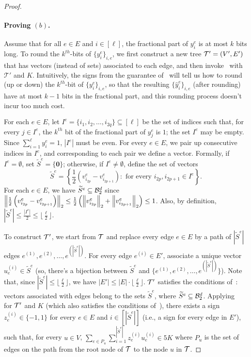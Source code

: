 \begin{proof}
\paragraph{Proving $(b)$.} Assume that for all $e \in E$ and $i\in [\ell]$, the fractional part of $y^e_i$ is at most $k$ bits long. To round the $k^{th}$-bits of $\{y^e_i\}_{i,e}$, we first construct a new tree $\mathcal{T}' = (V',E')$ that has vectors (instead of sets) associated to each edge, and then invoke~ with $\mathcal{T}'$ and $K$. Intuitively, the signs from the guarantee of~ will tell us how to round (up or down) the $k^{th}$-bit of $\{y^e_i\}_{i,e}$, so that the resulting $\{\hat{y}^e_i\}_{i,e}$ (after rounding) have at most $k-1$ bits in the fractional part, and this rounding process doesn't incur too much cost. 

For each $e \in E$, let $I^e = \{i_1, i_2, \ldots, i_{2q}\} \subseteq [\ell]$ be the set of indices such that, for every $j \in I^e$, the $k^{th}$ bit of the fractional part of $y^e_{j}$ is $1$; the set $I^e$ may be empty. Since $\sum_{i=1}^{\ell} y^e_i = 1$, $|I^e|$ must be even. For every $e \in E$, we pair up consecutive indices in $I^e$, and corresponding to each pair we define a vector. Formally, if $I^e = \emptyset$, set $\widetilde{S}^e = \{\mathbf{0}\}$; otherwise, if $I^e \neq \emptyset$, define the set of vectors 
\[
\widetilde{S}^e = \left\{ \frac{1}{2}\left(v^e_{i_{2p}} - v^e_{i_{2p+1}}\right) : \text{ for every } i_{2p}, i_{2p+1} \in I^e \right\}.
\]
For each $e \in E$, we have $\widetilde{S}^e \subseteq \mathcal{B}^d_2$ since $\left\lVert\frac{1}{2}\left(v^e_{i_{2p}} - v^e_{i_{2p+1}}\right)\right\rVert_2 \leq \frac{1}{2}\left( \left\lVert v^e_{i_{2p}}\right\rVert_2 + \left\lVert v^e_{i_{2p+1}}\right\rVert_2\right) \leq 1$.  Also, by definition, $|\widetilde{S}^e| \leq \frac{|I^e|}{2} \leq \lfloor \frac{\ell}{2} \rfloor$. 


To construct $\mathcal{T}'$, we start from $\mathcal{T}$ and replace every edge $e \in E$ by a path of $|\widetilde{S}^e|$ edges $e^{(1)}, e^{(2)}, \ldots, e^{(|\widetilde{S}^e|)}$. For every edge $e^{(i)} \in E'$, associate a unique vector $u^{(i)}_e \in \widetilde{S}^e$ (so, there's a bijection between $\widetilde{S}^e$ and $\{e^{(1)}, e^{(2)}, \ldots, e^{(|\widetilde{S}^e|)}\}$). Note that, since  $|\widetilde{S}^e| \leq \lfloor \frac{\ell}{2} \rfloor$, we have $|E'| \leq |E| \cdot \lfloor \frac{\ell}{2}\rfloor$. $\mathcal{T}'$ satisfies the conditions of~: vectors associated with edges belong to the sets $\widetilde{S}^e$, where $\widetilde{S}^e \subseteq \mathcal{B}^d_2$. Applying~ for $\mathcal{T}'$ and $K$ (which also satisfies the conditions of~), there exists a sign $z_e^{(i)} \in \{-1,1\}$ for every $e \in E$ and $i \in [|\widetilde{S}^e|]$ (i.e., a sign for every edge in $E'$), such that, for every $u \in V$, $\sum_{e \in P_u} \sum_{i=1}^{|\widetilde{S}^e|} z_e^{(i)}u_e^{(i)} \in 5 K$ where $P_u$ is the set of edges on the path from the root node of $\mathcal{T}$ to the node $u$ in $\mathcal{T}$.


\end{proof}
